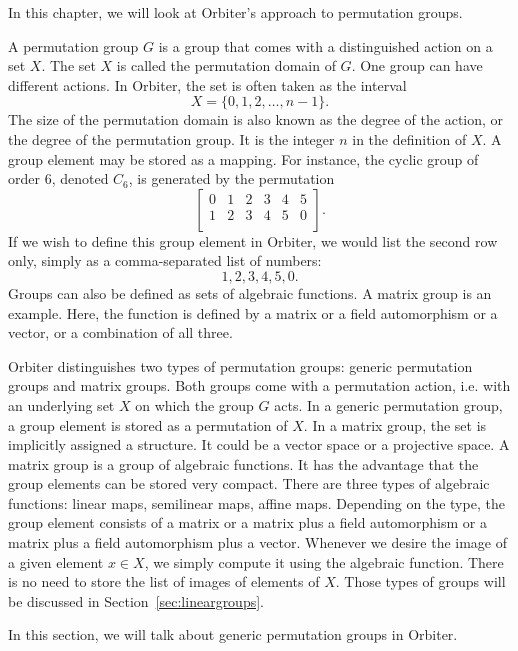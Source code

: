 

In this chapter, we will look at Orbiter's approach to permutation groups. 

\bigskip


A permutation group $G$ is a group that comes with a distinguished action on a set $X$. 
The set $X$ is called the permutation domain of $G$.
One group can have different actions. 
In Orbiter, the set is often taken as the interval 
$$
X = \{0,1,2,\ldots,n-1\}.
$$
The size of the permutation domain 
is also known as the degree of the action, 
or the degree of the permutation group. 
It is the integer $n$ in the definition of $X$.
A group element may be stored as a mapping.
For instance, the cyclic group of order $6$, denoted $C_6$, 
is generated by the permutation
$$
\left[
\begin{array}{cccccc}
0&1&2&3&4&5\\
1&2&3&4&5&0\\
\end{array}
\right].
$$
If we wish to define this group element in Orbiter, 
we would list the second row only, simply as a comma-separated list of numbers:
$$
1,2,3,4,5,0.
$$
Groups can also be defined as sets of algebraic functions. 
A matrix group is an example. 
Here, the function is defined by a matrix or 
a field automorphism or a vector, or a combination of all three.

\bigskip

Orbiter distinguishes two types of permutation groups: 
generic permutation groups and matrix groups. 
Both groups come with a permutation action, 
i.e. with an underlying set $X$ on which the group $G$ acts.
In a generic permutation group, a group element is stored as a permutation of $X.$
In a matrix group, the set is implicitly assigned a structure. 
It could be a vector space or a projective space. 
A matrix group is a group of algebraic functions. 
It has the advantage that the group elements can be stored very compact. 
There are three types of algebraic functions: linear maps, 
semilinear maps, affine maps. 
Depending on the type, the group element consists of a matrix 
or a matrix plus a field automorphism or 
a matrix plus a field automorphism plus a vector.
Whenever we desire the image of a given element 
$x \in X$, we simply compute it using the algebraic function. 
There is no need to store the list of images of elements of $X$. 
Those types of groups will be discussed in Section~\ref{sec:lineargroups}.


\bigskip


In this section, we will talk about generic permutation groups in Orbiter. 



